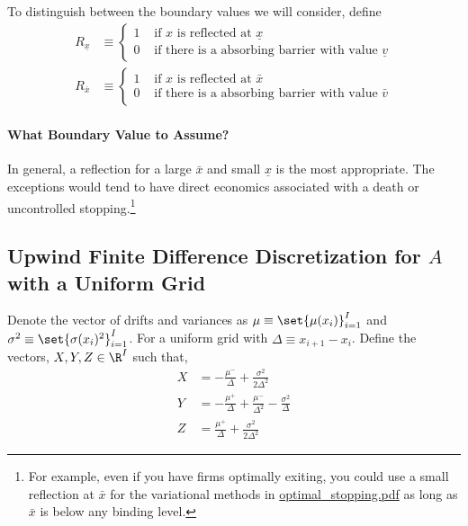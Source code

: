 \documentclass[11pt]{etk-article}
\begin{document}
To distinguish between the boundary values we will consider, define
\begin{align}
	R_{\underline{x}} &\equiv \begin{cases}
		1 & \text{ if $x$ is reflected at $\underline{x}$}\\
		0 & \text{ if there is a absorbing barrier with value $\underline{v}$}
	\end{cases}\label{eq:R-x-min}\\
	R_{\bar{x}} &\equiv \begin{cases}
	1 & \text{ if $x$ is reflected at $\bar{x}$}\\
	0 & \text{ if there is a absorbing barrier with value $\bar{v}$}
\end{cases}\label{eq:R-x-max}
\end{align}	
\paragraph{What Boundary Value to Assume?}
In general, a reflection for a large $\bar{x}$ and small $\underline{x}$ is the most appropriate.  The exceptions would tend to have direct economics associated with a death or uncontrolled stopping.\footnote{For example, even if you have firms optimally exiting, you could use a small reflection at $\bar{x}$ for the variational methods in \url{optimal_stopping.pdf} as long as $\bar{x}$ is below any binding level.}

\subsection{Upwind Finite Difference Discretization for $A$ with a Uniform Grid}
Denote the vector of drifts and variances as $\mu \equiv \set{\mu(x_i)}_{i=1}^I$ and $\sigma^2 \equiv \set{\sigma(x_i)^2}_{i=1}^I$.  For a uniform grid with $\Delta \equiv x_{i+1} - x_i$.  Define the vectors, $X,Y,Z \in \R^I$ such that,
\begin{align}
	X &= - \frac{\mu^{-}}{\Delta}+ \frac{\sigma^{2}}{2 \Delta^2}\label{eq:X} \\
	Y &= - \frac{\mu^{+}}{\Delta} + \frac{\mu^{-}}{\Delta^2}- \frac{\sigma^{2}}{\Delta}\label{eq:Y} \\
	Z &= \frac{\mu^{+}}{\Delta} + \frac{\sigma^{2}}{2 \Delta^2}\label{eq:Z}
\end{align}
\end{document}
